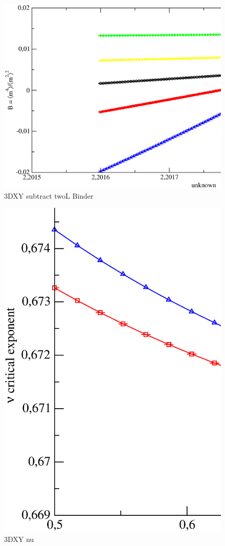 \begin{figure}[!htpb]
  \centering
  \includegraphics[width=\textwidth]{./plots/3DXY/vsT/subtract_twoL_Binder.eps}
  \caption{3DXY subtract twoL Binder}
\end{figure}


\begin{figure}[!htpb]
  \centering
  \includegraphics[width=\textwidth]{./plots/3DXY/vsO/nu.eps}
  \caption{3DXY nu}
\end{figure}

